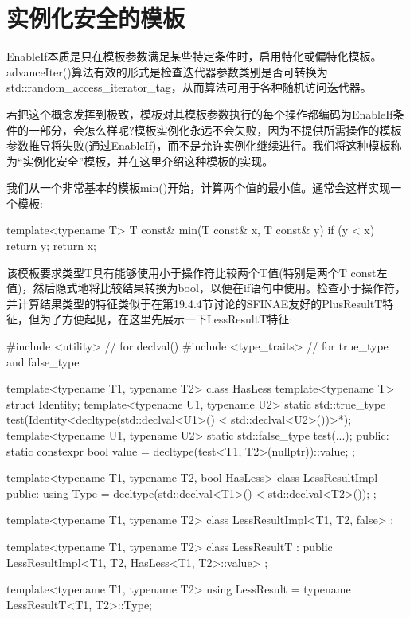\section{实例化安全的模板}
EnableIf本质是只在模板参数满足某些特定条件时，启用特化或偏特化模板。advanceIter()算法有效的形式是检查迭代器参数类别是否可转换为std::random\_access\_iterator\_tag，从而算法可用于各种随机访问迭代器。

若把这个概念发挥到极致，模板对其模板参数执行的每个操作都编码为EnableIf条件的一部分，会怎么样呢?模板实例化永远不会失败，因为不提供所需操作的模板参数推导将失败(通过EnableIf)，而不是允许实例化继续进行。我们将这种模板称为“实例化安全”模板，并在这里介绍这种模板的实现。

我们从一个非常基本的模板min()开始，计算两个值的最小值。通常会这样实现一个模板:

\begin{cpp}
template<typename T>
T const& min(T const& x, T const& y)
{
	if (y < x) {
		return y;
	}
	return x;
}
\end{cpp}

该模板要求类型T具有能够使用小于操作符比较两个T值(特别是两个T const左值)，然后隐式地将比较结果转换为bool，以便在if语句中使用。检查小于操作符，并计算结果类型的特征类似于在第19.4.4节讨论的SFINAE友好的PlusResultT特征，但为了方便起见，在这里先展示一下LessResultT特征:

\begin{cpp}
#include <utility> // for declval()
#include <type_traits> // for true_type and false_type

template<typename T1, typename T2>
class HasLess {
	template<typename T> struct Identity;
	template<typename U1, typename U2> static std::true_type
		test(Identity<decltype(std::declval<U1>() < std::declval<U2>())>*);
	template<typename U1, typename U2> static std::false_type
		test(...);
	public:
	static constexpr bool value = decltype(test<T1, T2>(nullptr))::value;
};

template<typename T1, typename T2, bool HasLess>
class LessResultImpl {
	public:
	using Type = decltype(std::declval<T1>() < std::declval<T2>());
};

template<typename T1, typename T2>
class LessResultImpl<T1, T2, false> {
};

template<typename T1, typename T2>
class LessResultT
: public LessResultImpl<T1, T2, HasLess<T1, T2>::value> {
};

template<typename T1, typename T2>
using LessResult = typename LessResultT<T1, T2>::Type;
\end{cpp}

